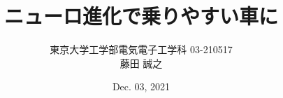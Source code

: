 \documentclass{ltjsarticle}
\title{ニューロ進化で乗りやすい車に}
\author{東京大学工学部電気電子工学科 03-210517 \\ 藤田 誠之}
\date{Dec. 03, 2021}
\begin{document}
\maketitle

\section{}
\end{document}
